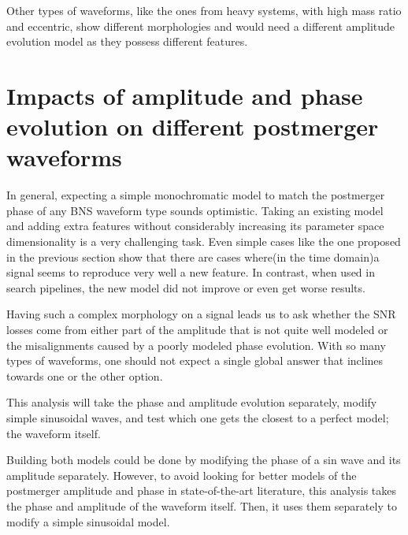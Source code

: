 Other types of waveforms, like the ones from heavy systems, with high mass ratio and eccentric, show different morphologies and would need a different amplitude evolution model as they possess different features.



\section{Impacts of amplitude and phase evolution on different postmerger  waveforms}

In general, expecting a simple monochromatic model to match the postmerger phase of any BNS waveform type sounds optimistic. Taking an existing model and adding extra features without considerably increasing its parameter space dimensionality is a very challenging task. Even simple cases like the one proposed in the previous section show that there are cases where(in the time domain)a signal seems to reproduce very well a new feature. In contrast, when used in search pipelines, the new model did not improve or even get worse results. 

Having such a complex morphology on a signal leads us to ask whether the SNR losses come from either part of the amplitude that is not quite well modeled or the misalignments caused by a poorly modeled phase evolution. With so many types of waveforms, one should not expect a single global answer that inclines towards one or the other option.

This analysis will take the phase and amplitude evolution separately, modify simple sinusoidal waves, and test which one gets the closest to a perfect model; the waveform itself.

Building both models could be done by modifying the phase of a sin wave and its amplitude separately. However, to avoid looking for better models of the postmerger amplitude and phase in state-of-the-art literature, this analysis takes the phase and amplitude of the waveform itself. Then, it uses them separately to modify a simple sinusoidal model.


